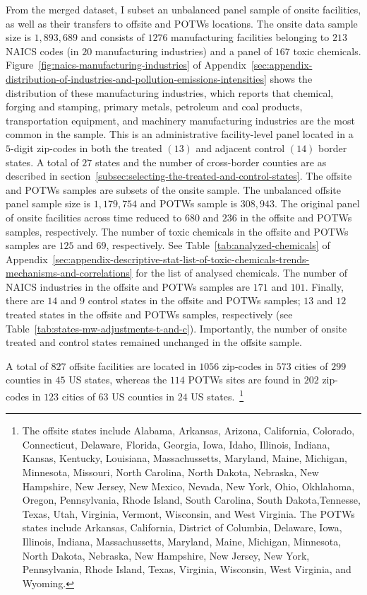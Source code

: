 \documentclass{C:/Users/david/OneDrive/Documents/ULMS/PhD/Thesis/chapter3/src/climate_change/latex/Economic_Journal/OUP-EJ}
\begin{document}
    From the merged dataset, I subset an unbalanced panel sample of onsite facilities, as well as their transfers to offsite and POTWs locations. The onsite data sample size is $1,893,689$ and consists of $1276$ manufacturing facilities belonging to $213$ NAICS codes (in $20$ manufacturing industries) and a panel of $167$ toxic chemicals. Figure~\ref{fig:naics-manufacturing-industries} of Appendix~\ref{sec:appendix-distribution-of-industries-and-pollution-emissions-intensities} shows the distribution of these manufacturing industries, which reports that chemical, forging and stamping, primary metals, petroleum and coal products, transportation equipment, and machinery manufacturing industries are the most common in the sample. This is an administrative facility-level panel located in a $5$-digit zip-codes in both the treated $(13)$ and adjacent control $(14)$ border states. A total of $27$ states and the number of cross-border counties are as described in section~\ref{subsec:selecting-the-treated-and-control-states}. The offsite and POTWs samples are subsets of the onsite sample. The unbalanced offsite panel sample size is $1,179,754$ and POTWs sample is $308,943$. The original panel of onsite facilities across time reduced to $680$ and $236$ in the offsite and POTWs samples, respectively. The number of toxic chemicals in the offsite and POTWs samples are $125$ and $69$, respectively. See Table~\ref{tab:analyzed-chemicals} of Appendix~\ref{sec:appendix-descriptive-stat-list-of-toxic-chemicals-trends-mechanisms-and-correlations} for the list of analysed chemicals. The number of NAICS industries in the offsite and POTWs samples are $171$ and $101$. Finally, there are $14$ and $9$ control states in the offsite and POTWs samples; $13$ and $12$ treated states in the offsite and POTWs samples, respectively (see Table~\ref{tab:states-mw-adjustments-t-and-c}). Importantly, the number of onsite treated and control states remained unchanged in the offsite sample.

    A total of $827$ offsite facilities are located in $1056$ zip-codes in $573$ cities of $299$ counties in $45$ US states, whereas the $114$ POTWs sites are found in $202$ zip-codes in $123$ cities of $63$ US counties in $24$ US states.~\footnote{\tiny The offsite states include Alabama, Arkansas, Arizona, California, Colorado, Connecticut, Delaware, Florida, Georgia, Iowa, Idaho, Illinois, Indiana, Kansas, Kentucky, Louisiana, Massachussetts, Maryland, Maine, Michigan, Minnesota, Missouri, North Carolina, North Dakota, Nebraska, New Hampshire, New Jersey, New Mexico, Nevada, New York, Ohio, Okhlahoma, Oregon, Pennsylvania, Rhode Island, South Carolina, South Dakota,Tennesse, Texas, Utah, Virginia, Vermont, Wisconsin, and West Virginia. The POTWs states include Arkansas, California, District of Columbia, Delaware, Iowa, Illinois, Indiana, Massachussetts, Maryland, Maine, Michigan, Minnesota, North Dakota, Nebraska, New Hampshire, New Jersey, New York, Pennsylvania, Rhode Island, Texas, Virginia, Wisconsin, West Virginia, and Wyoming.}
\end{document}

